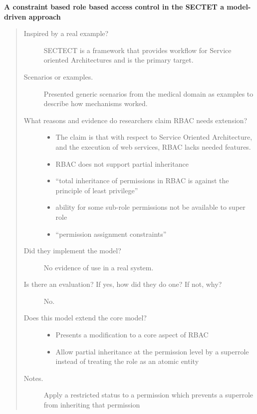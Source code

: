 \documentclass[letterpaper,10pt,english]{sphinxmanual}
\begin{document}
\textbf{A constraint based role based access control in the SECTET a model-driven approach}
\begin{quote}
\begin{description}
\item[{Inspired by a real example?}] \leavevmode
SECTECT is a framework that provides workflow for Service oriented Architectures and is the primary target.

\item[{Scenarios or examples.}] \leavevmode
Presented generic scenarios from the medical domain as examples to describe how mechanisms worked.

\item[{What reasons and evidence do researchers claim RBAC needs extension?}] \leavevmode\begin{itemize}
\item {} 
The claim is that with respect to Service Oriented Architecture, and the execution of web services, RBAC lacks needed features.

\item {} 
RBAC does not support partial inheritance

\item {} 
``total inheritance of permissions in RBAC is against the principle of least privilege''

\item {} 
ability for some sub-role permissions not be available to super role

\item {} 
``permission assignment constraints''

\end{itemize}

\item[{Did they implement the model?}] \leavevmode
No evidence of use in a real system.

\item[{Is there an evaluation? If yes, how did they do one? If not, why?}] \leavevmode
No.

\item[{Does this model extend the core model?}] \leavevmode\begin{itemize}
\item {} 
Presents a modification to a core aspect of RBAC

\item {} 
Allow partial inheritance at the permission level by a superrole instead of treating the role as an atomic entity

\end{itemize}

\item[{Notes.}] \leavevmode
Apply a restricted status to a permission which prevents a superrole from inheriting that permission

\end{description}
\end{quote}
\end{document}
